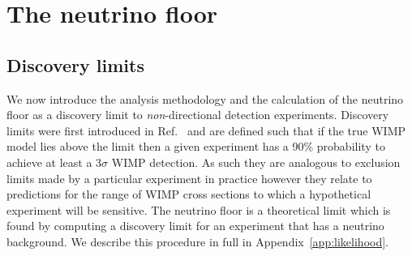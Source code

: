 \section{The neutrino floor}\label{sec:nufloor_nufloor}
\subsection{Discovery limits}
We now introduce the analysis methodology and the calculation of the neutrino floor as a discovery limit to {\it non}-directional detection experiments. Discovery limits were first introduced in Ref.~\cite{Billard:2011zj} and are defined such that if the true WIMP model lies above the limit then a given experiment has a 90\% probability to achieve at least a 3$\sigma$ WIMP detection. As such they are analogous to exclusion limits made by a particular experiment in practice however they relate to predictions for the range of WIMP cross sections to which a hypothetical experiment will be sensitive. The neutrino floor is a theoretical limit which is found by computing a discovery limit for an experiment that has a neutrino background. We describe this procedure in full in Appendix~\ref{app:likelihood}.

